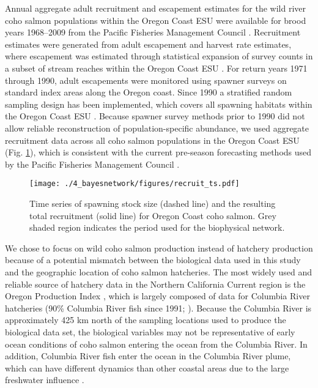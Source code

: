 Annual aggregate adult recruitment and escapement estimates for the wild river
coho salmon populations within the Oregon Coast ESU were available for brood
years 1968--2009 from the Pacific Fisheries Management Council \citep{PFMC2013,
Rupp2012}. Recruitment estimates were generated from adult escapement and
harvest rate estimates, where escapement was estimated through statistical
expansion of survey counts in a subset of stream reaches within the Oregon Coast
ESU \citep{Lewis2010}. For return years 1971 through 1990, adult escapements
were monitored using spawner surveys on standard index areas along the Oregon
coast. Since 1990 a stratified random sampling design has been implemented,
which covers all spawning habitats within the Oregon Coast ESU
\citep{Jacobs1998, Lewis2010}. Because spawner survey methods prior to 1990 did
not allow reliable reconstruction of population-specific abundance, we used
aggregate recruitment data across all coho salmon populations in the Oregon
Coast ESU (Fig. \ref{fig:bn:3}), which is consistent with the current pre-season
forecasting methods used by the Pacific Fisheries Management Council
\citep{PFMC2013}.

\begin{figure}[htbp]
  \centering \texttt{[image: ./4\_bayesnetwork/figures/recruit\_ts.pdf]}
  \caption[Time series of spawning stock size and the resulting
           total recruitment]{Time series of spawning stock size (dashed line)
           and the resulting total recruitment (solid line) for Oregon Coast
           coho salmon. Grey shaded region indicates the period used for the
           biophysical network.}
  \label{fig:bn:3}
\end{figure}

We chose to focus on wild coho salmon production instead of hatchery production
because of a potential mismatch between the biological data used in this study
and the geographic location of coho salmon hatcheries. The most widely used and
reliable source of hatchery data in the Northern California Current region is
the Oregon Production Index \citep{Logerwell2003a, Koslow2002a, Cole2000a},
which is largely composed of data for Columbia River hatcheries (90\% Columbia
River fish since 1991; \citealp{PFMC2013}). Because the Columbia River is
approximately 425 km north of the sampling locations used to produce the
biological data set, the biological variables may not be representative of early
ocean conditions of coho salmon entering the ocean from the Columbia River. In
addition, Columbia River fish enter the ocean in the Columbia River plume, which
can have different dynamics than other coastal areas due to the large freshwater
influence \citep{Hickey1998}.

